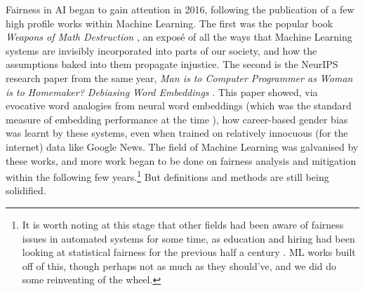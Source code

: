 Fairness in AI began to gain attention in 2016, following the publication of a few high profile works within Machine Learning. The first was the popular book \textit{Weapons of Math Destruction} \citep{oneil2016weapons}, an exposé of all the ways that Machine Learning systems are invisibly incorporated into parts of our society, and how the assumptions baked into them propagate injustice. The second is the NeurIPS research paper from the same year, \textit{Man is to Computer Programmer as Woman is to Homemaker? Debiasing Word Embeddings} \citep{bolukbasi}. This paper showed, via evocative word analogies from neural word embeddings (which was the standard measure of embedding performance at the time \citep{mikolov-etal-2013-linguistic, wordsim, drozd-etal-2016-word}), how career-based gender bias was learnt by these systems, even when trained on relatively innocuous (for the internet) data like Google News. The field of Machine Learning was galvanised by these works, and more work began to be done on fairness analysis and mitigation within the following few years.\footnote{It is worth noting at this stage that other fields had been aware of fairness issues in automated systems for some time, as education and hiring had been looking at statistical fairness for the previous half a century \citep{hutchinson_mitchell_2019}. ML works built off of this, though perhaps not as much as they should've, and we did do some reinventing of the wheel.} But definitions and methods are still being solidified.


